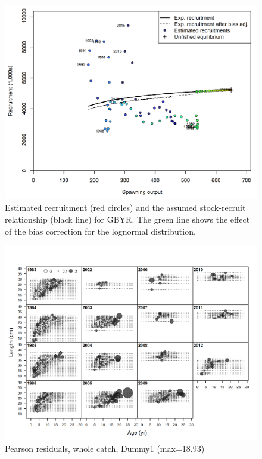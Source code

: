 \documentclass[12pt,]{article}
\begin{document}
\begin{figure}
\centering
\includegraphics{r4ss/plots_mod1/SR_curve2.png}
\caption{Estimated recruitment (red circles) and the assumed
stock-recruit relationship (black line) for GBYR. The green line shows
the effect of the bias correction for the lognormal distribution.
\label{fig:SR_curve2}}
\end{figure}

\FloatBarrier

\begin{figure}
\centering
\includegraphics{./r4ss/plots_mod1/comp_condAALfit_residsflt12mkt0.png}
\caption{Pearson residuals, whole catch, Dummy1 (max=18.93)
\label{fig:mod1_4_comp_condAALfit_residsflt12mkt0}}
\end{figure}
\end{document}
